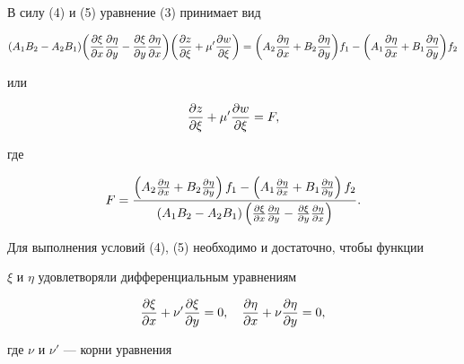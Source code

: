 В силу (4) и (5) уравнение (3) принимает вид 


$$


(A_1B_2-A_2B_1)\bigg(\myfrac{\xi}{x}\myfrac{\eta}{y}- 


\myfrac{\xi}{y}\myfrac{\eta}{x} \bigg) 


\bigg(\myfrac{z}{\xi}+\mu'\myfrac{w}{\xi} \bigg)= \\ 


\bigg(A_2\myfrac{\eta}{x}+B_2\myfrac{\eta}{y} \bigg)f_1- 


\bigg(A_1\myfrac{\eta}{x}+B_1\myfrac{\eta}{y} \bigg)f_2


$$


или 


\begin{equation} 


\myfrac{z}{\xi}+\mu'\myfrac{w}{\xi}=F, 


\end{equation} 


где 


$$ 


F=\frac{\left(A_2\myfrac{\eta}{x}+B_2\myfrac{\eta}{y}\right) f_1- 


\left(A_1\myfrac{\eta}{x}+B_1\myfrac{\eta}{y}\right)f_2} 


{(A_1B_2-A_2B_1)\left( 


\myfrac{\xi}{x}\myfrac{\eta}{y}-\myfrac{\xi}{y}\myfrac{\eta}{x} 


\right)}. 


$$ 


 


Для выполнения условий (4), (5) необходимо и достаточно, чтобы функции 


$\xi$ и $\eta$ удовлетворяли дифференциальным уравнениям 


\begin{equation} 


\myfrac{\xi}{x}+\nu'\myfrac{\xi}{y}=0,\quad 


\myfrac{\eta}{x}+\nu\myfrac{\eta}{y}=0, 


\end{equation} 


где $\nu$ и $\nu'$ --- корни уравнения 


